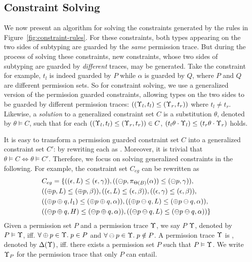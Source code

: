 {{{ \subsection{Constraint Solving}\label{sec:constraint_solve}
We now present an algorithm for solving the constraints generated by the rules in Figure~\ref{fig:constraint-rules}.
For these constraints, both types appearing on the two sides of subtyping are
guarded by the \emph{same} permission trace. But during the process of solving these constraints, new constraints, whose two sides of subtyping are guarded by \emph{different} traces, may be generated.
Take the constraint  for example,
$t_l$ is indeed guarded by $P$ while $\alpha$ is guarded by $Q$, where $P$ and $Q$ are different permission sets.
So for constraint solving, we use a generalized version of the permission guarded constraints, allowing types on the two sides to be guarded by different permission traces:
$((\Upsilon_l,t_l)\leq(\Upsilon_r,t_r))$
where $t_l \not = t_r.$
Likewise, a \emph{solution} to a generalized constraint set $C$ is a substitution $\theta$, denoted by $\theta \vDash C$,  such that for each $((\Upsilon_l,t_l)\leq(\Upsilon_r,t_r)) \in C$, $(t_l\theta\cdot \Upsilon_l) \leq_{} (t_r\theta \cdot \Upsilon_r)$ holds.

It is easy to transform a permission guarded constraint set $C$ into a
generalized constraint set $C'$: by rewriting each  as .
Moreover, it is trivial that $\theta \vDash C \Longleftrightarrow \theta \vDash C'$.
Therefore, we focus on solving generalized constraints in the following.
For example, the constraint set $C_{eg}$ can be rewritten as
{\myeqsize
\begin{align*}
&C_{eg} = \{((\epsilon,L)\leq(\epsilon,\gamma)),
((\ominus p,\pi_{{\Theta(B)}}({\alpha}))\leq(\ominus p,\gamma)),\\
&((\oplus p,L)\leq(\oplus p,\beta)),
((\epsilon,L)\leq(\epsilon,\beta)),
((\epsilon,\gamma)\leq(\epsilon,\beta)),\\
&((\oplus p\oplus q,l_1)\leq(\oplus p\oplus q,\alpha)),
((\oplus p\ominus q,L)\leq(\oplus p\ominus q,\alpha)),\\
&((\ominus p\oplus q,H)\leq(\ominus p\oplus q,\alpha)),
((\ominus p\ominus q,L)\leq(\ominus p\ominus q,\alpha))\}
\end{align*}
}
Given a permission set $P$ and a permission trace $\Upsilon$, we say $P$  $\Upsilon$, denoted by $P \vDash \Upsilon$, iff. $\forall \oplus p \in \Upsilon. \; p\in P$ and $\forall \ominus p\in\Upsilon.\; p\notin P$.
A permission trace $\Upsilon$ is , denoted by $\Delta(\Upsilon)$, iff. there exists a permission set $P$ such that $P\vDash \Upsilon$.
We write $\Upsilon_{P}$ for the permission trace that only $P$ can entail.

}}}

